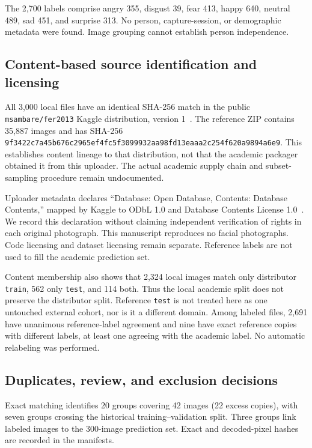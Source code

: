 \documentclass[11pt,a4paper]{article}
\begin{document}
The 2,700 labels comprise angry 355, disgust 39, fear 413, happy 640, neutral
489, sad 451, and surprise 313. No person, capture-session, or demographic
metadata were found. Image grouping cannot establish person independence.

\subsection{Content-based source identification and licensing}
All 3,000 local files have an identical SHA-256 match in the public
\texttt{msambare/fer2013} Kaggle distribution, version 1~\cite{kaggle}.
The reference ZIP contains 35,887 images and has SHA-256
\texttt{9f3422c7a45b676c2965ef4fc5f3099932aa98fd13eaaa2c254f620a9894a6e9}.
This establishes content lineage to that distribution, not that the academic
packager obtained it from this uploader. The actual academic supply chain and
subset-sampling procedure remain undocumented.

Uploader metadata declares ``Database: Open Database, Contents: Database
Contents,'' mapped by Kaggle to ODbL 1.0 and Database Contents License
1.0~\cite{kagglelicenses,odbl,dbcl}. We record this declaration without claiming
independent verification of rights in each original photograph. This manuscript
reproduces no facial photographs. Code licensing and dataset licensing remain
separate. Reference labels are not used to fill the academic prediction set.

Content membership also shows that 2,324 local images match only distributor
\texttt{train}, 562 only \texttt{test}, and 114 both. Thus the local academic
split does not preserve the distributor split. Reference \texttt{test} is not
treated here as one untouched external cohort, nor is it a different domain.
Among labeled files, 2,691 have unanimous reference-label agreement and nine
have exact reference copies with different labels, at least one agreeing with
the academic label. No automatic relabeling was performed.

\subsection{Duplicates, review, and exclusion decisions}
Exact matching identifies 20 groups covering 42 images (22 excess copies), with
seven groups crossing the historical training--validation split. Three groups
link labeled images to the 300-image prediction set. Exact and decoded-pixel
hashes are recorded in the manifests.
\end{document}
